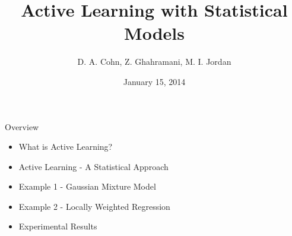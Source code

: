 \documentclass[10pt]{beamer}
\begin{document}
\title{Active Learning with Statistical Models}
\subtitle{D. A. Cohn, Z. Ghahramani, M. I. Jordan}

\author[S. Fuchs]{}

\date[15.01.2014]{January 15, 2014}

\begin{frame}[plain]
  \titlepage
\end{frame}

\begin{frame}{Overview}
\begin{itemize}
  \item What is Active Learning?
  \item Active Learning - A Statistical Approach
  \item Example 1 - Gaussian Mixture Model
  \item Example 2 - Locally Weighted Regression
  \item Experimental Results
\end{itemize}
\end{frame}
\end{document}
